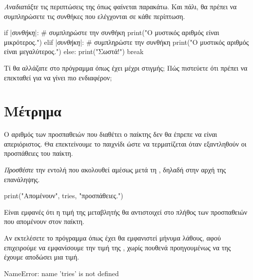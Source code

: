 \documentclass[a4paper,11pt,oneside]{book}
\begin{document}
\begin{step}
\emph{Αναδιατάξτε} τις περιπτώσεις της  όπως φαίνεται παρακάτω. Και πάλι, θα πρέπει να συμπληρώσετε τις συνθήκες που ελέγχονται σε κάθε περίπτωση.

\begin{pynew}
    if |\textrm{\textit{συνθήκη}}|: # συμπληρώστε την συνθήκη
        print("Ο μυστικός αριθμός είναι μικρότερος.")
    elif |\textrm{\textit{συνθήκη}}|: # συμπληρώστε την συνθήκη
        print("Ο μυστικός αριθμός είναι μεγαλύτερος.")
    else:
        print("Σωστά!")
        break
\end{pynew}

\end{step}

\begin{step}
Τί θα αλλάζατε στο πρόγραμμα όπως έχει μέχρι στιγμής; Πώς πιστεύετε ότι πρέπει να επεκταθεί για να γίνει πιο ενδιαφέρον;

\marginnote[14pt]{\icondiscuss}
\dottedline

\dottedline
\end{step}

\section{Μέτρημα}

Ο αριθμός των προσπαθειών που διαθέτει ο παίκτης δεν θα έπρεπε να είναι απεριόριστος. Θα επεκτείνουμε το παιχνίδι ώστε να τερματίζεται όταν εξαντληθούν οι προσπάθειες του παίκτη.

\begin{step}
\label{step:tries-print}
\emph{Προσθέστε} την εντολή που ακολουθεί αμέσως μετά τη , δηλαδή στην αρχή της επανάληψης.

\begin{pynew}
print("Απομένουν", tries, "προσπάθειες.")
\end{pynew}

Είναι εμφανές ότι η τιμή της μεταβλητής  θα αντιστοιχεί στο πλήθος των προσπαθειών που απομένουν στον παίκτη. 

\marginnote[16pt]{\iconcaution}
Αν εκτελέσετε το πρόγραμμα όπως έχει θα εμφανιστεί μήνυμα λάθους, αφού επιχειρούμε να εμφανίσουμε την τιμή της , χωρίς πουθενά προηγουμένως να της έχουμε αποδώσει μια τιμή.

\marginnote[16pt]{\iconcomputer}
\begin{pyterm}
NameError: name 'tries' is not defined
\end{pyterm}
\end{step}
\end{document}
